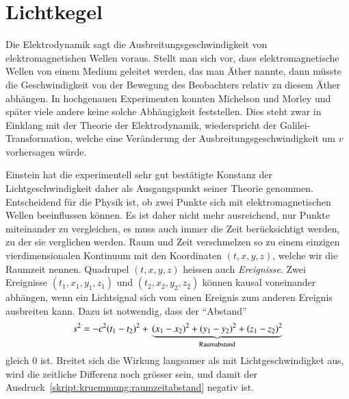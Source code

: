 \section{Lichtkegel}
Die Elektrodynamik sagt die Ausbreitungsgeschwindigkeit von
elektromagnetishen Wellen voraus.
Stellt man sich vor, dass elektromagnetische Wellen von einem
Medium geleitet werden, das man Äther nannte, dann müsste die
Geschwindigkeit von der Bewegung des Beobachters relativ zu
diesem Äther abhängen.
In hochgenauen Experimenten konnten Michelson und Morley und später
viele andere keine solche Abhängigkeit feststellen.
Dies steht zwar in Einklang mit der Theorie der Elektrodynamik,
wiederspricht der Galilei-Transformation, welche eine Veränderung
der Ausbreitungsgeschwindigkeit um $v$ vorhersagen würde.

Einstein hat die experimentell sehr gut bestätigte Konstanz der
Lichtgeschwindigkeit daher als Ausgangspunkt seiner Theorie genommen.
Entscheidend für die Physik ist, ob zwei Punkte sich mit elektromagnetischen
Wellen beeinflussen können.
Es ist daher nicht mehr ausreichend, nur Punkte miteinander zu vergleichen,
es muss auch immer die Zeit berücksichtigt werden, zu der sie verglichen
werden.
Raum und Zeit verschmelzen so zu einem einzigen vierdimensionalen
Kontinuum mit den Koordinaten $(t,x,y,z)$, welche wir die Raumzeit
nennen.
Quadrupel $(t,x,y,z)$ heissen auch {\em Ereignisse}.
Zwei Ereignisse $(t_1,x_1,y_1,z_1)$ und $(t_2,x_2,y_2,z_2)$ können
kausal voneinander abhängen, wenn ein Lichtsignal sich vom einen Ereignis
zum anderen Ereignis ausbreiten kann.
Dazu ist notwendig, dass der ``Abstand''
\begin{equation}
s^2
=
-c^2(t_1-t_2)^2
+
\mathstrut
\underbrace{
(x_1-x_2)^2
+
(y_1-y_2)^2
+
(z_1-z_2)^2}_{\text{Raumabstand}}
\label{skript:kruemmung:raumzeitabstand}
\end{equation}
gleich $0$ ist.
Breitet sich die Wirkung langsamer als mit Lichtgeschwindigket aus,
wird die zeitliche Differenz noch grösser sein, und damit der
Ausdruck~\eqref{skript:kruemmung:raumzeitabstand} negativ ist.

